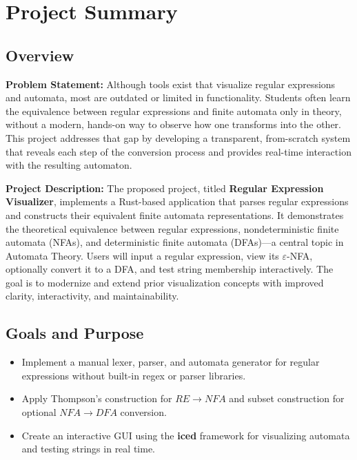 \documentclass[00_project_proposal.tex]{subfiles}
\begin{document}
\section{Project Summary}

\subsection{Overview}

\textbf{Problem Statement:}
Although tools exist that visualize regular expressions and automata, most are outdated or limited in functionality.
Students often learn the equivalence between regular expressions and finite automata only in theory, without a modern, hands-on way to observe how one transforms into the other.
This project addresses that gap by developing a transparent, from-scratch system that reveals each step of the conversion process and provides real-time interaction with the resulting automaton.

\textbf{Project Description:}
The proposed project, titled \textbf{Regular Expression Visualizer}, implements a Rust-based application that parses regular expressions and constructs their equivalent finite automata representations.
It demonstrates the theoretical equivalence between regular expressions, nondeterministic finite automata (NFAs), and deterministic finite automata (DFAs)—a central topic in Automata Theory.
Users will input a regular expression, view its $\varepsilon$-NFA, optionally convert it to a DFA, and test string membership interactively.
The goal is to modernize and extend prior visualization concepts with improved clarity, interactivity, and maintainability.

\subsection{Goals and Purpose}

\begin{itemize}
    \item Implement a manual lexer, parser, and automata generator for regular expressions without built-in regex or parser libraries.
    \item Apply Thompson's construction for \(RE \rightarrow NFA\) and subset construction for optional \(NFA \rightarrow DFA\) conversion.
    \item Create an interactive GUI using the \textbf{iced} framework for visualizing automata and testing strings in real time.
\end{itemize}
\end{document}
